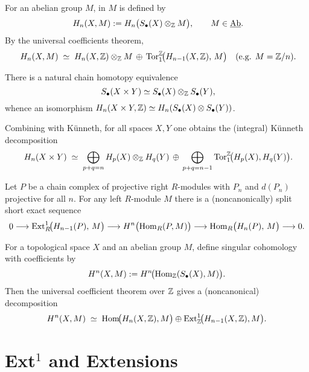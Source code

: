 For an abelian group \( M \),  in \( M \) is defined by
\[
	\ H_n(X,M) := H_n\bigl(S_{\bullet}(X) \otimes_{\mathbb{Z}} M\bigr), \qquad M \in \underline{\mathrm{Ab}}.
\]
By the universal coefficients theorem,
\[
	\ H_n(X,M) \;\simeq\; H_n(X,\mathbb{Z})\otimes_{\mathbb{Z}} M \,\oplus\, \operatorname{Tor}^{\mathbb{Z}}_1\!\bigl(H_{n-1}(X,\mathbb{Z}),\, M\bigr) \quad (\text{e.g. } M=\mathbb{Z}/n).
\]

\begin{theorem*}
	There is a natural chain homotopy equivalence
	\[
		\ S_{\bullet}(X\times Y) \simeq S_{\bullet}(X) \otimes_{\mathbb{Z}} S_{\bullet}(Y),
	\]
	whence an isomorphism \( H_n(X\times Y,\mathbb{Z}) \simeq H_n(S_{\bullet}(X)\otimes S_{\bullet}(Y)) \).
\end{theorem*}

Combining with K\"unneth, for all spaces \( X,Y \) one obtains the (integral) K\"unneth decomposition
\[
	\ H_n(X\times Y) \;\simeq\; \bigoplus_{p+q=n} H_p(X)\otimes_{\mathbb{Z}} H_q(Y) \,\oplus\, \bigoplus_{p+q=n-1} \operatorname{Tor}^{\mathbb{Z}}_1\!\bigl(H_p(X), H_q(Y)\bigr).
\]

\begin{theorem*}
	Let \( P \) be a chain complex of projective right \( R \)-modules with \( P_n \) and \( d(P_n) \) projective for all \( n \). For any left \( R \)-module \( M \) there is a (noncanonically) split short exact sequence
	\[
		0 \longrightarrow \operatorname{Ext}^{1}_{R}\!\bigl(H_{n-1}(P),\, M\bigr)
		\longrightarrow H^{n} \bigl(\operatorname{Hom}_{R}(P, M)\bigr)
		\longrightarrow \operatorname{Hom}_{R} \bigl(H_{n}(P),\, M\bigr)
		\longrightarrow 0.
	\]
\end{theorem*}


For a topological space \( X \) and an abelian group \( M \), define singular cohomology with coefficients by
\[
	H^{n}(X,M) := H^{n}\!\bigl(\operatorname{Hom}_{\mathbb{Z}}(S_{\bullet}(X), M)\bigr).
\]
Then the universal coefficient theorem over \( \mathbb{Z} \) gives a (noncanonical) decomposition
\[
	H^{n}(X,M) \;\simeq\; \operatorname{Hom}\!\bigl(H_{n}(X,\mathbb{Z}), M\bigr) \oplus \operatorname{Ext}^{1}_{\mathbb{Z}}\!\bigl(H_{n-1}(X,\mathbb{Z}), M\bigr).
\]

\section{Ext\texorpdfstring{$^1$}{1} and Extensions}

